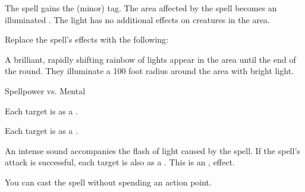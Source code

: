
The spell gains the  (minor) tag.
The area affected by the spell becomes an illuminated .
The light has no additional effects on creatures in the area.









Replace the spell's effects with the following:
\begin{spellcontent}

\begin{augmenteffects}



\spelleffect
A brilliant, rapidly shifting rainbow of lights appear in the area until the end of the round.
They illuminate a 100 foot radius around the area with bright light.




\begin{spellattack}{Spellpower vs. Mental}


\spellsuccess
Each target is \disoriented as a .



\spellcritical
Each target is \confused as a .



\end{spellattack}





\end{augmenteffects}

\end{spellcontent}






An intense sound accompanies the flash of light caused by the spell.
If the spell's attack is successful, each target is also \deafened as a .
This is an ,  effect.






You can cast the spell without spending an action point.




